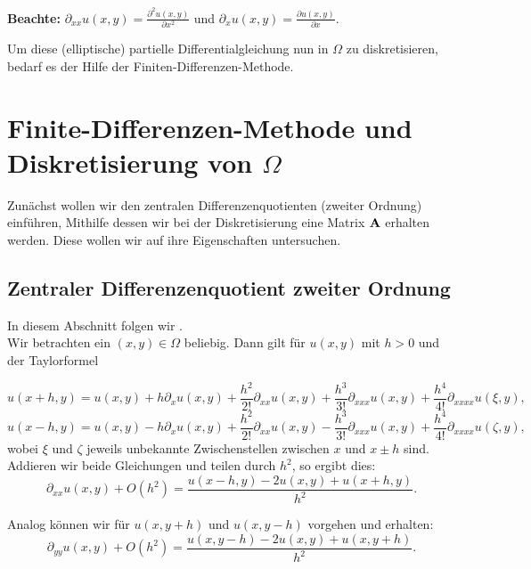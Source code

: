 \textbf{Beachte:} $\partial_{xx}u(x,y) = \frac {\partial^{2}u(x,y)} {\partial x^{2}}$ und $\partial_{x}u(x,y) = \frac {\partial u(x,y)} {\partial x}$.

Um diese (elliptische) partielle Differentialgleichung nun in $\Omega$ zu diskretisieren, bedarf es der Hilfe der Finiten-Differenzen-Methode.

\section{Finite-Differenzen-Methode und Diskretisierung von $\Omega$}\label{s.Finite Differenzen}

Zunächst wollen wir den zentralen Differenzenquotienten (zweiter Ordnung) einführen, Mithilfe dessen wir bei der Diskretisierung eine Matrix ${\textbf{A}}$ erhalten werden. Diese wollen wir auf ihre Eigenschaften untersuchen.

\subsection{Zentraler Differenzenquotient zweiter Ordnung}\label{ss.Differenzenquotient zweiter Ordnung}

In diesem Abschnitt folgen wir \cite[S. 18-19]{ALO02}.\\
Wir betrachten ein $(x,y) \in \Omega$ beliebig. Dann gilt für $u(x,y)$ mit $h > 0$ und der Taylorformel

\begin{equation}
u(x+h,y) = u(x,y) + h \partial_{x} u(x,y) + \frac {h^{2}} {2!} \partial_{xx} u(x,y) + \frac{h^{3}}{3!} \partial_{xxx} u(x,y) + \frac{h^{4}}{4!} \partial_{xxxx} u(\xi,y),\label{eq.Partiall x+h}
\end{equation}
\begin{equation}
u(x-h,y) = u(x,y) - h \partial_{x} u(x,y) + \frac {h^{2}} {2!} \partial_{xx} u(x,y) - \frac{h^{3}}{3!} \partial_{xxx} u(x,y) + \frac{h^{4}}{4!} \partial_{xxxx} u(\zeta,y),\label{eq.Partiall x-h}
\end{equation}
wobei $\xi$ und $\zeta$ jeweils unbekannte Zwischenstellen zwischen $x$ und $x \pm h$ sind. Addieren wir beide Gleichungen und teilen durch $h^{2}$, so ergibt dies:
\begin{equation}
\partial_{xx} u(x,y) + O(h^{2}) = \frac {u(x-h,y) - 2u(x,y) + u(x+h,y)} {h^{2}}.
\end{equation}

Analog können wir für $u(x,y+h)$ und $u(x,y-h)$ vorgehen und erhalten:
\begin{equation}
\partial_{yy} u(x,y) + O(h^{2}) = \frac {u(x,y-h) - 2u(x,y) + u(x,y+h)} {h^{2}}.
\end{equation}

